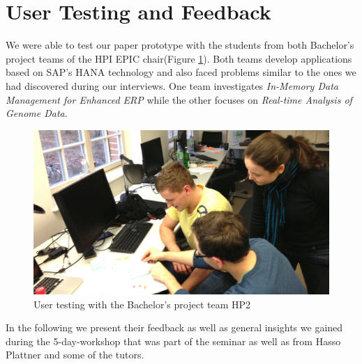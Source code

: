
\section[User Testing and Feedback (Author: Thomas B\"unger)]{User Testing and Feedback}
\label{sec:USER_TESTING}

We were able to test our paper prototype with the students from both Bachelor's project teams of the HPI EPIC chair(Figure \ref{fig:user_testing}). Both teams develop applications based on SAP's HANA technology and also faced problems similar to the ones we had discovered during our interviews. One team investigates \emph{In-Memory Data Management for Enhanced ERP} while the other focuses on \emph{Real-time Analysis of Genome Data}.

\begin{figure}
\begin{centering}
    \includegraphics[width=1.0\linewidth]{images/user_testing}
    \caption{User testing with the Bachelor's project team HP2}
    \label{fig:user_testing}
\end{centering}
\end{figure}

In the following we present their feedback as well as general insights we gained during the 5-day-workshop that was part of the seminar as well as from Hasso Plattner and some of the tutors.

